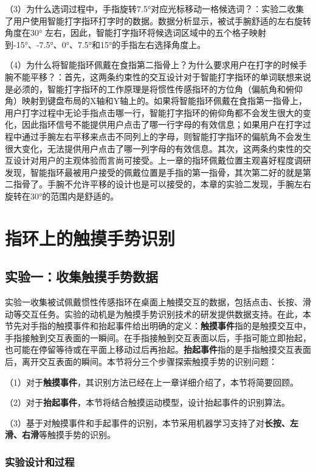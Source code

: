 {（3）为什么选词过程中，手指旋转7.5°对应光标移动一格候选词？}：实验二收集了用户使用智能打字指环打字时的数据。数据分析显示，被试手腕舒适的左右旋转角度在30° 左右，因此，智能打字指环将候选词区域中的五个格子映射到-15°、-7.5°、0°、7.5°和15°的手指左右选择角度上。

{（4）为什么将智能指环佩戴在食指第二指骨上？为什么要求用户在打字的时候手腕不能平移？}：首先，这两条约束性的交互设计对于智能打字指环的单词联想来说是必须的，智能打字指环的工作原理是将惯性传感指环的方位角（偏航角和俯仰角）映射到键盘布局的X轴和Y轴上的。如果将智能指环佩戴在食指第一指骨上，用户打字过程中无论手指点击哪一行，智能打字指环的俯仰角都不会发生很大的变化，因此指环信号不能提供用户点击了哪一行字母的有效信息；如果用户在打字过程中通过手腕左右平移来点击不同列上的字母，则智能打字指环的偏航角不会发生很大变化，无法提供用户点击了哪一列字母的有效信息。其次，这两条约束性的交互设计对用户的主观体验而言尚可接受。上一章的指环佩戴位置主观喜好程度调研发现，智能指环最被用户接受的佩戴位置是手指的第一指骨，其次第二好的就是第二指骨了。手腕不允许平移的设计也是可以接受的，本章的实验二发现，手腕左右旋转在30°的范围内是舒适的。

\section{指环上的触摸手势识别}

\subsection{实验一：收集触摸手势数据}

实验一收集被试佩戴惯性传感指环在桌面上触摸交互的数据，包括点击、长按、滑动等交互任务。实验的动机是为触摸手势识别技术的研发提供数据支持。在此，本节先对手指的触摸事件和抬起事件给出明确的定义：\textbf{触摸事件}指的是触摸交互中，手指接触到交互表面的一瞬间。在手指接触到交互表面以后，手指可能立即抬起，也可能在停留等待或在平面上移动过后再抬起。\textbf{抬起事件}指的是手指触摸交互表面后，离开交互表面的瞬间。本节将分三个步骤探索触摸手势的识别问题：

（1）对于\textbf{触摸事件}，其识别方法已经在上一章详细介绍了，本节将简要回顾。

（2）对于\textbf{抬起事件}，本节将结合触摸运动模型，设计抬起事件的识别算法。

（3）基于对触摸事件和手起事件的识别，本节采用机器学习支持了对\textbf{长按、左滑、右滑}等触摸手势的识别。

\subsubsection{实验设计和过程}

